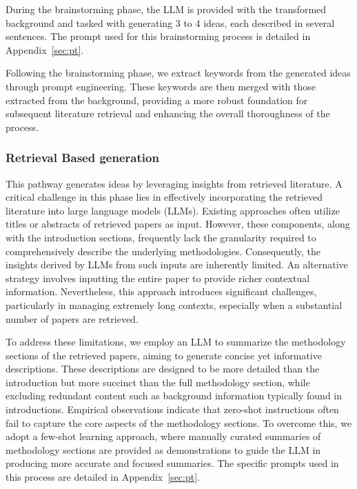 \documentclass{article}
\theoremstyle{plain}
\theoremstyle{definition}
\theoremstyle{remark}
\begin{document}
During the brainstorming phase, the LLM is provided with the transformed background and tasked with generating 3 to 4 ideas, each described in several sentences. The prompt used for this brainstorming process is detailed in Appendix~\ref{sec:pt}.

Following the brainstorming phase, we extract keywords from the generated ideas through prompt engineering. These keywords are then merged with those extracted from the background, providing a more robust foundation for subsequent literature retrieval and enhancing the overall thoroughness of the process.

\subsubsection{Retrieval Based generation}

This pathway generates ideas by leveraging insights from retrieved literature. A critical challenge in this phase lies in effectively incorporating the retrieved literature into large language models (LLMs). Existing approaches often utilize titles or abstracts of retrieved papers as input. However, these components, along with the introduction sections, frequently lack the granularity required to comprehensively describe the underlying methodologies. Consequently, the insights derived by LLMs from such inputs are inherently limited. An alternative strategy involves inputting the entire paper to provide richer contextual information. Nevertheless, this approach introduces significant challenges, particularly in managing extremely long contexts, especially when a substantial number of papers are retrieved.

To address these limitations, we employ an LLM to summarize the methodology sections of the retrieved papers, aiming to generate concise yet informative descriptions. These descriptions are designed to be more detailed than the introduction but more succinct than the full methodology section, while excluding redundant content such as background information typically found in introductions. Empirical observations indicate that zero-shot instructions often fail to capture the core aspects of the methodology sections. To overcome this, we adopt a few-shot learning approach, where manually curated summaries of methodology sections are provided as demonstrations to guide the LLM in producing more accurate and focused summaries. The specific prompts used in this process are detailed in Appendix~\ref{sec:pt}.
\end{document}
